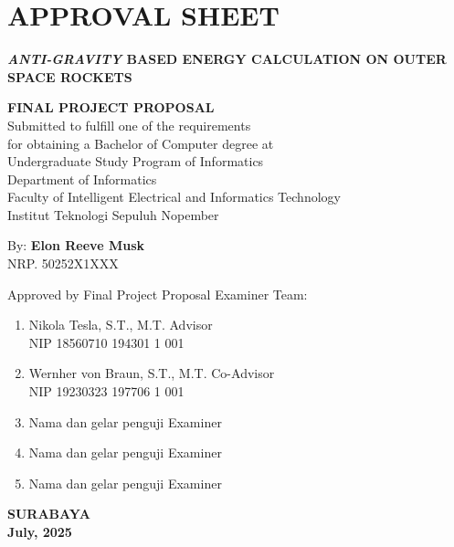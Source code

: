 \chapter*{APPROVAL SHEET}

\thispagestyle{empty}

\begin{center}
  \textbf{\emph{ANTI-GRAVITY} BASED ENERGY CALCULATION ON OUTER SPACE ROCKETS}
\end{center}

\begingroup
  \small

  \begin{center}
    \textbf{FINAL PROJECT PROPOSAL} \\
    Submitted to fulfill one of the requirements \\ 
    for obtaining a Bachelor of Computer degree at \\
    Undergraduate Study Program of Informatics \\
    Department of Informatics \\
    Faculty of Intelligent Electrical and Informatics Technology \\
    Institut Teknologi Sepuluh Nopember
  \end{center}

  \begin{center}
    By: \textbf{Elon Reeve Musk} \\
    NRP. 50252X1XXX
  \end{center}

  \begin{center}
    Approved by Final Project Proposal Examiner Team:
  \end{center}

  \begin{enumerate}
    \item Nikola Tesla, S.T., M.T. \hfill Advisor \\
          NIP 18560710 194301 1 001
    \item Wernher von Braun, S.T., M.T. \hfill Co-Advisor \\
          NIP 19230323 197706 1 001
    
    \item Nama dan gelar penguji \hfill Examiner
    
    \item Nama dan gelar penguji \hfill Examiner
    
    \item Nama dan gelar penguji \hfill Examiner
  \end{enumerate}
  
  \vspace{\fill}

  \begin{center}
    \textbf{SURABAYA} \\
    \textbf{July, 2025}
  \end{center}
\endgroup
